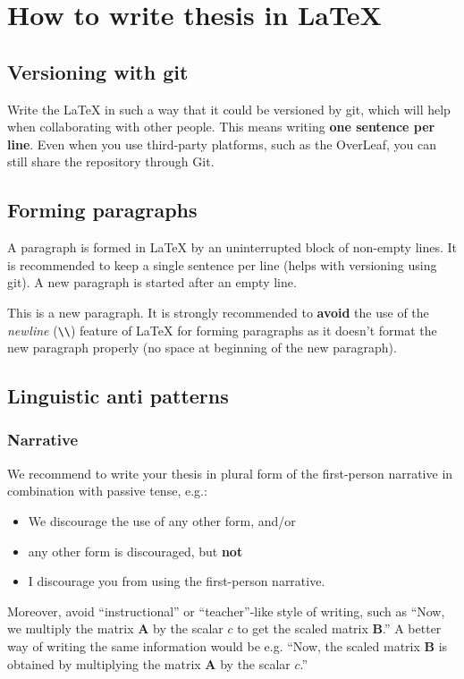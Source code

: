 
\chapter{How to write thesis in LaTeX\label{chap:how_to}}

\section{Versioning with git}

Write the LaTeX in such a way that it could be versioned by git, which will help when collaborating with other people.
This means writing \textbf{one sentence per line}.
Even when you use third-party platforms, such as the OverLeaf, you can still share the repository through Git.

\section{Forming paragraphs}

A paragraph is formed in LaTeX by an uninterrupted block of non-empty lines.
It is recommended to keep a single sentence per line (helps with versioning using git).
A new paragraph is started after an empty line.

This is a new paragraph. It is strongly recommended to \textbf{avoid} the use of the \emph{newline} (\texttt{\textbackslash\textbackslash}) feature of LaTeX for forming paragraphs as it doesn't format the new paragraph properly (no space at beginning of the new paragraph).

\section{Linguistic anti patterns}

\subsection{Narrative}

We recommend to write your thesis in plural form of the first-person narrative in combination with passive tense, e.g.:
\begin{itemize}
  \item We discourage the use of any other form, and/or
  \item any other form is discouraged, but \textbf{not}
  \item {\color{red} I discourage you from using the first-person narrative}.
\end{itemize}
Moreover, avoid \enquote{instructional} or \enquote{teacher}-like style of writing, such as {\color{red} \enquote{Now, we multiply the matrix $\mathbf{A}$ by the scalar $c$ to get the scaled matrix $\mathbf{B}$.}}
A better way of writing the same information would be e.g. \enquote{Now, the scaled matrix $\mathbf{B}$ is obtained by multiplying the matrix $\mathbf{A}$ by the scalar $c$.}


